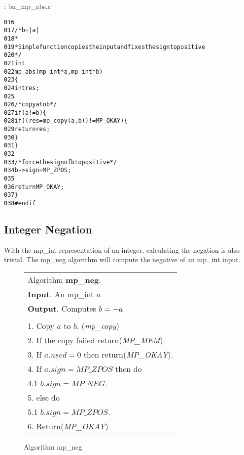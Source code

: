 \documentclass[b5paper]{book}
\begin{document}
\vspace{+3mm}\begin{small}
\hspace{-5.1mm}{\bf File}: bn\_mp\_abs.c
\vspace{-3mm}
\begin{alltt}
016   
017   /* b = |a| 
018    *
019    * Simple function copies the input and fixes the sign to positive
020    */
021   int
022   mp_abs (mp_int * a, mp_int * b)
023   \{
024     int     res;
025   
026     /* copy a to b */
027     if (a != b) \{
028        if ((res = mp_copy (a, b)) != MP_OKAY) \{
029          return res;
030        \}
031     \}
032   
033     /* force the sign of b to positive */
034     b->sign = MP_ZPOS;
035   
036     return MP_OKAY;
037   \}
038   #endif
\end{alltt}
\end{small}

\subsection{Integer Negation}
With the mp\_int representation of an integer, calculating the negation is also trivial.  The mp\_neg algorithm will compute
the negative of an mp\_int input.

\begin{figure}[here]
\begin{center}
\begin{tabular}{l}
\hline Algorithm \textbf{mp\_neg}. \\
\textbf{Input}.   An mp\_int $a$ \\
\textbf{Output}.  Computes $b = -a$ \\
\hline \\
1.  Copy $a$ to $b$.  (\textit{mp\_copy}) \\
2.  If the copy failed return(\textit{MP\_MEM}). \\
3.  If $a.used = 0$ then return(\textit{MP\_OKAY}). \\
4.  If $a.sign = MP\_ZPOS$ then do \\
\hspace{3mm}4.1  $b.sign = MP\_NEG$. \\
5.  else do \\
\hspace{3mm}5.1  $b.sign = MP\_ZPOS$. \\
6.  Return(\textit{MP\_OKAY}) \\
\hline
\end{tabular}
\end{center}
\caption{Algorithm mp\_neg}
\end{figure}
\end{document}
